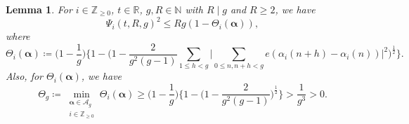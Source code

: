 \documentclass[hidelinks]{amsart}
\numberwithin{equation}{section}
\theoremstyle{plain}
\newtheorem{lemma}{Lemma}
\theoremstyle{definition}
\begin{document}
\begin{lemma}
\label{lem:Psi_bound_S_eq_g}
For $i\in\mathbb{Z}_{\ge0}$, $t\in\mathbb{R}$, $g,R\in\mathbb{N}$ with $R\mid g$ and $R\ge2$, we have
\[
\Psi_{i}(t,R,g)^{2}
\le
Rg(1-\Theta_{i}(\bm{\alpha})),
\]
where
\[
\Theta_{i}(\bm{\alpha})
\coloneqq
\biggl(1-\frac{1}{g}\biggr)
\biggl\{
1-\biggl(1
-
\frac{2}{g^{2}(g-1)}\sum_{1\le h<g}
\biggl|
\sum_{0\le n,n+h<g}
e(\alpha_{i}(n+h)-\alpha_{i}(n))
\biggr|^{2}\biggr)^{\frac{1}{2}}
\biggr\}.
\]
Also, for $\Theta_{i}(\bm{\alpha})$, we have
\begin{equation}
\label{lem:Psi_bound_S_eq_g:def:Theta}
\Theta_{g}
\coloneqq
\min_{\substack{
\bm{\alpha}\in\mathscr{A}_{g}\\
i\in\mathbb{Z}_{\ge0}
}}
\Theta_{i}(\bm{\alpha})
\ge
\biggl(1-\frac{1}{g}\biggr)
\biggl\{
1-\biggl(1
-
\frac{2}{g^{2}(g-1)}\biggr)^{\frac{1}{2}}
\biggr\}
>
\frac{1}{g^{3}}
>0.
\end{equation}
\end{lemma}
\end{document}

